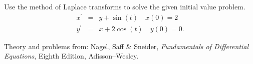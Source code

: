 \documentclass[11pt]{article}
\begin{document}

\begin{problem}
Use the method of Laplace transforms to solve the given initial value problem.
\begin{eqnarray*}
x^{\prime} & = & y + \sin(t) \quad x(0)=2 \\
y^{\prime} & = & x + 2 \cos(t) \quad y(0) = 0 .
\end{eqnarray*}
\end{problem}






\LabSolutions


Theory and problems from: Nagel, Saff \& Sneider, \textit{Fundamentals of Differential Equations}, Eighth Edition, Adisson--Wesley.
\end{document}
